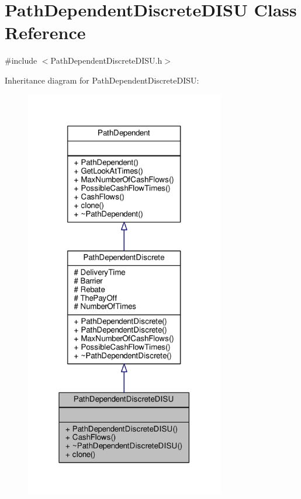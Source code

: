 \hypertarget{classPathDependentDiscreteDISU}{}\section{Path\+Dependent\+Discrete\+D\+I\+SU Class Reference}
\label{classPathDependentDiscreteDISU}


{\ttfamily \#include $<$Path\+Dependent\+Discrete\+D\+I\+S\+U.\+h$>$}



Inheritance diagram for Path\+Dependent\+Discrete\+D\+I\+SU\+:
\nopagebreak
\begin{figure}[H]
\begin{center}
\leavevmode
\includegraphics[width=247pt]{classPathDependentDiscreteDISU__inherit__graph}
\end{center}
\end{figure}


